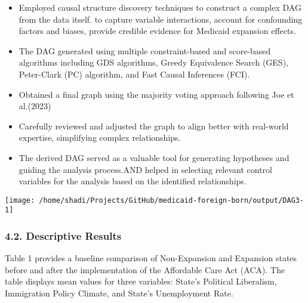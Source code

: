 \documentclass[
]{article}
\begin{document}
\begin{itemize}
\item
  Employed causal structure discovery techniques to construct a complex
  DAG from the data itself. to capture variable interactions, account
  for confounding factors and biases, provide credible evidence for
  Medicaid expansion effects.
\item
  The DAG generated using multiple constraint-based and score-based
  algorithms including GDS algorithms, Greedy Equivalence Search (GES),
  Peter-Clark (PC) algorithm, and Fast Causal Inferences (FCI).
\item
  Obtained a final graph using the majority voting approach following
  Joe et al.(2023)
\item
  Carefully reviewed and adjusted the graph to align better with
  real-world expertise, simplifying complex relationships.
\item
  The derived DAG served as a valuable tool for generating hypotheses
  and guiding the analysis process.AND helped in selecting relevant
  control variables for the analysis based on the identified
  relationships.
\end{itemize}

\begin{center}\texttt{[image: /home/shadi/Projects/GitHub/medicaid-foreign-born/output/DAG3-1]} \end{center}

\hypertarget{descriptive-results}{%
\subsubsection{4.2. Descriptive Results}\label{descriptive-results}}

Table 1 provides a baseline comparison of Non-Expansion and Expansion
states before and after the implementation of the Affordable Care Act
(ACA). The table displays mean values for three variables: State's
Political Liberalism, Immigration Policy Climate, and State's
Unemployment Rate.
\end{document}
